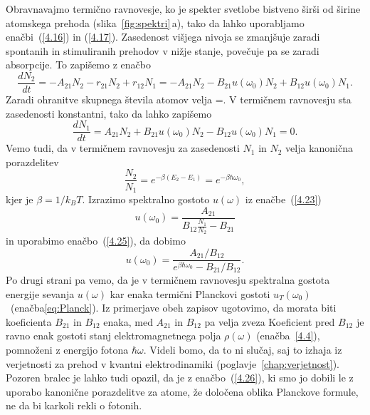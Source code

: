 Obravnavajmo termično ravnovesje, ko je spekter svetlobe bistveno širši
od širine atomskega prehoda (slika~\ref{fig:spektri}\,a), tako da lahko
uporabljamo enačbi~(\ref{4.16}) in (\ref{4.17}). Zasedenost višjega nivoja
se zmanjšuje zaradi spontanih in stimuliranih prehodov v nižje
stanje, povečuje pa se zaradi absorpcije. To zapišemo z enačbo
\begin{equation}
\frac{dN_{2}}{dt}=-A_{21}N_2 - r_{21}N_2 + r_{12}N_1 = 
-A_{21}N_{2}-B_{21}u(\omega_{0})N_{2}+B_{12}u(\omega_{0})N_{1}.
\label{4.22}
\end{equation}
Zaradi ohranitve skupnega števila atomov velja 
\beq
{}=.
\eeq
V termičnem ravnovesju sta zasedenosti konstantni, tako da lahko zapišemo 
\begin{equation}
\frac{dN_{1}}{dt}=A_{21}N_{2}+B_{21}u(\omega_{0})N_{2}-B_{12}u(\omega_{0})N_{1}=0.
\label{4.23}
\end{equation}
Vemo tudi, da v termičnem ravnovesju za zasedenosti $N_{1}$ in $N_{2}$ velja
kanonična porazdelitev
\begin{equation}
\frac{N_{2}}{N_{1}}=e^{-\beta(E_{2}-E_{1})} = e^{-\beta \hbar \omega_0},
\label{4.25}
\end{equation}
kjer je $\beta=1/k_BT$. Izrazimo spektralno gostoto $u(\omega)$ 
iz enačbe~(\ref{4.23})
\begin{equation}
u(\omega_{0})=\frac{A_{21}}{B_{12}\frac{N_{1}}{N_{2}}-B_{21}}
\label{4.24}
\end{equation}
in uporabimo enačbo~(\ref{4.25}), da dobimo
\begin{equation}
u(\omega_{0})=\frac{A_{21}/B_{12}}{e^{\beta\hbar\omega_{0}}-B_{21}/B_{12}}.
\label{4.26}
\end{equation}
Po drugi strani pa vemo, da je v termičnem ravnovesju spektralna gostota energije sevanja
$u(\omega)$ kar enaka termični Planckovi gostoti $u_{T}(\omega_{0})$~(enačba\ref{eq:Planck}).
Iz primerjave obeh zapisov ugotovimo, da morata biti koeficienta $B_{21}$ in $B_{12}$ enaka,
med $A_{21}$ in $B_{12}$ pa velja zveza 
Koeficient pred $B_{12}$ je ravno enak gostoti stanj elektromagnetnega polja 
$\rho(\omega)$ (enačba~\ref{4.4}), pomnoženi z energijo fotona $\hbar\omega$. 
Videli bomo, da to ni slučaj, saj to izhaja iz verjetnosti za prehod v kvantni 
elektrodinamiki (poglavje~\ref{chap:verjetnost}).
Pozoren bralec je lahko tudi opazil, da je z enačbo~(\ref{4.26}),
ki smo jo dobili le z uporabo kanonične porazdelitve za atome, že
določena oblika Planckove formule, ne da bi karkoli rekli o fotonih.

